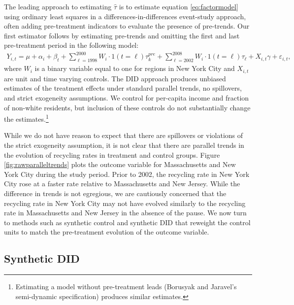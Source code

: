 \documentclass[12pt]{article}
\begin{document}
The leading approach to estimating \(\hat{\tau}\) is to estimate equation \ref{eq:factormodel} using ordinary least squares in a differences-in-differences event-study approach, often adding pre-treatment indicators to evaluate the presence of pre-trends.  Our first estimator follows \cite{borusyakjaravel2018} by estimating pre-trends and omitting the first and last pre-treatment period in the following model:
\begin{align} \label{eq:did}
    Y_{i,t} = \mu + \alpha_i + \beta_t + \sum_{\ell = 1998}^{2000} W_{i} \cdot 1(t=\ell) \tau_k^{pre} +  \sum_{\ell=2002}^{2008} W_{i} \cdot 1(t=\ell) \tau_\ell + X_{i,t}\gamma + \varepsilon_{i,t},
\end{align}
where \(W_i\) is a binary variable equal to one for regions in New York City and \(X_{i,t}\) are unit and time varying controls. The DID approach produces unbiased estimates of the treatment effects under standard parallel trends, no spillovers, and strict exogeneity assumptions. We control for per-capita income and fraction of non-white residents, but inclusion of these controls do not substantially change the estimates.\footnote{Estimating a model without pre-treatment leads (Borusyak and Jaravel's semi-dynamic specification) produces similar estimates.}  

While we do not have reason to expect that there are spillovers or violations of the strict exogeneity assumption, it is not clear that there are parallel trends in the evolution of recycling rates in treatment and control groups.  Figure \ref{fig:rawparalleltrends} plots the outcome variable for Massachusetts and New York City during the study period.  Prior to 2002, the recycling rate in New York City rose at a faster rate relative to Massachusetts and New Jersey.  While the difference in trends is not egregious, we are cautiously concerned that the recycling rate in New York City may not have evolved similarly to the recycling rate in Massachusetts and New Jersey in the absence of the pause.  We now turn to methods such as synthetic control and synthetic DID that reweight the control units to match the pre-treatment evolution of the outcome variable.

\subsection{Synthetic DID}
\end{document}
